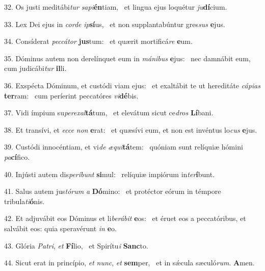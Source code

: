 32. Os justi meditábi\textit{tur} \textit{sa}\textit{pi}\textbf{én}tiam, \ast\  et lingua ejus loquétur \textit{ju}\textbf{dí}cium.\

33. Lex Dei ejus in \textit{cor}\textit{de} \textit{ip}\textbf{sí}us, \ast\  et non supplantabúntur gres\textit{sus} \textbf{e}jus.\

34. Consíderat \textit{pec}\textit{cá}\textit{tor} \textbf{jus}tum: \ast\  et quærit mortificá\textit{re} \textbf{e}um.\

35. Dóminus autem non derelínquet eum in \textit{má}\textit{ni}\textit{bus} \textbf{e}jus: \ast\  nec damnábit eum, cum judicábi\textit{tur} \textbf{il}li.\

36. Exspécta Dóminum, et custódi viam ejus: \dag\  et exaltábit te ut hereditáte \textit{cá}\textit{pi}\textit{as} \textbf{ter}ram: \ast\  cum períerint peccatóres \textit{vi}\textbf{dé}bis.\

37. Vidi ímpium su\textit{per}\textit{ex}\textit{al}\textbf{tá}tum, \ast\  et elevátum sicut ce\textit{dros} \textbf{Lí}bani.\

38. Et transívi, et \textit{ec}\textit{ce} \textit{non} \textbf{e}rat: \ast\  et quæsívi eum, et non est invéntus lo\textit{cus} \textbf{e}jus.\

39. Custódi innocéntiam, et vi\textit{de} \textit{æ}\textit{qui}\textbf{tá}tem: \ast\  quóniam sunt relíquiæ hómini \textit{pa}\textbf{cí}fico.\

40. Injústi autem dis\textit{per}\textit{í}\textit{bunt} \textbf{si}mul: \ast\  relíquiæ impiórum in\textit{ter}\textbf{í}bunt.\

41. Salus autem jus\textit{tó}\textit{rum} \textit{a} \textbf{Dó}mino: \ast\  et protéctor eórum in témpore tribula\textit{ti}\textbf{ó}nis.\

42. Et adjuvábit eos Dóminus et li\textit{be}\textit{rá}\textit{bit} \textbf{e}os: \ast\  et éruet eos a peccatóribus, et salvábit eos: quia speravérunt \textit{in} \textbf{e}o.\

43. Glória \textit{Pa}\textit{tri}, \textit{et} \textbf{Fí}lio, \ast\  et Spirítu\textit{i} \textbf{Sanc}to.\

44. Sicut erat in princípio, \textit{et} \textit{nunc}, \textit{et} \textbf{sem}per, \ast\  et in sǽcula sæculó\textit{rum}. \textbf{A}men.\

